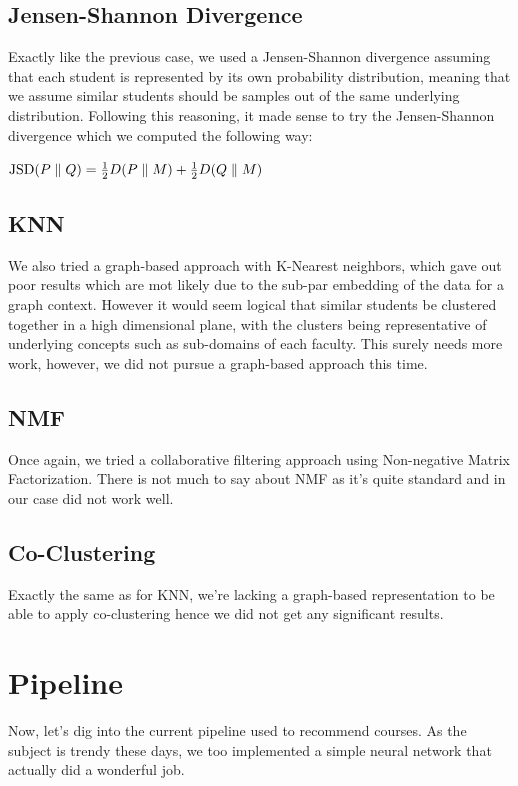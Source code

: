\documentclass{article}
\begin{document}
    \subsection{Jensen-Shannon Divergence}
        Exactly like the previous case, we used a Jensen-Shannon divergence\cite{jensen} assuming that each student is represented by its own probability distribution, meaning that we assume similar students should be samples out of the same underlying distribution. Following this reasoning, it made sense to try the Jensen-Shannon divergence\cite{jensen} which we computed the following way:
        \begin{center}
        ${\rm JSD}(P \parallel Q)= \frac{1}{2}D(P \parallel M)+\frac{1}{2}D(Q \parallel M)$
        \end{center}

    \subsection{KNN}
        We also tried a graph-based approach with K-Nearest neighbors, which gave out poor results which are mot likely due to the sub-par embedding of the data for a graph context. However it would seem logical that similar students be clustered together in a high dimensional plane, with the clusters being representative of underlying concepts such as sub-domains of each faculty. This surely needs more work, however, we did not pursue a graph-based approach this time.

    \subsection{NMF}
        Once again, we tried a collaborative filtering approach using Non-negative Matrix Factorization. There is not much to say about NMF as it's quite standard and in our case did not work well.

    \subsection{Co-Clustering}
        Exactly the same as for KNN, we're lacking a graph-based representation to be able to apply co-clustering hence we did not get any significant results.

\section{Pipeline}
    Now, let's dig into the current pipeline used to recommend courses. As the subject is trendy these days, we too implemented a simple neural network that actually did a wonderful job.
\end{document}

